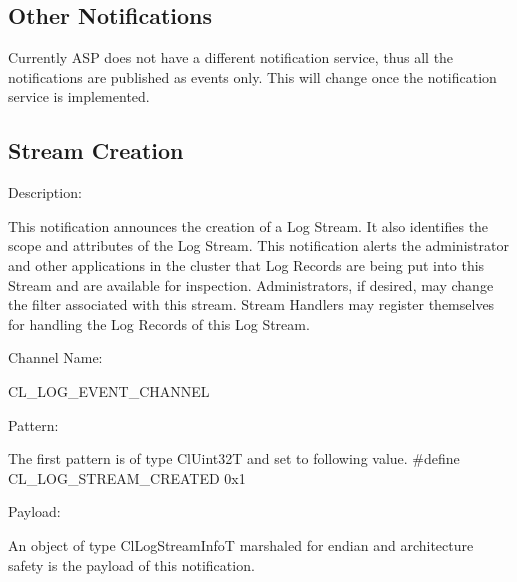\begin{flushleft}
\section{Other Notifications}
Currently ASP does not have a different notification service, thus all the notifications are published as events only. This will change once the 
notification service is implemented.


\subsection{Stream Creation}
\begin{Desc}
\item[Description:]\end{Desc}
This notification announces the creation of a Log Stream. It also identifies the scope and attributes of the Log Stream. This notification alerts 
the administrator and other applications in the cluster that Log Records are being put into this Stream and are available for inspection. Administrators,
if desired, may change the filter associated with this stream. Stream Handlers may register themselves for handling the Log Records of this Log Stream.
\begin{Desc}
\item[Channel Name:]\end{Desc}
CL\_\-LOG\_\-EVENT\_\-CHANNEL
\begin{Desc}
\item[Pattern:]\end{Desc}
The first pattern is of type ClUint32T and set to following value.
\#define CL\_\-LOG\_\-STREAM\_\-CREATED	0x1
\begin{Desc}
\item[Payload:]\end{Desc}
An object of type ClLogStreamInfoT marshaled for endian and architecture safety is the payload of this notification.



\end{flushleft}
